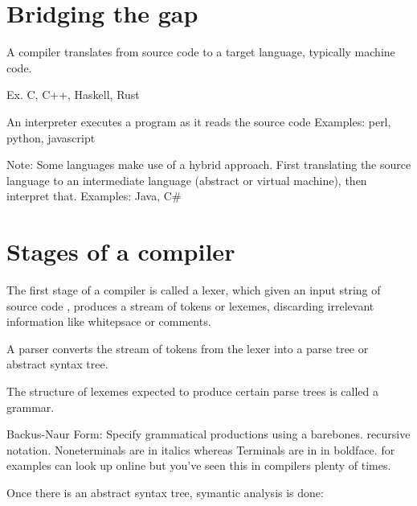 \section{Bridging the gap}

\begin{definition}
  A compiler translates from source code to a target language,
  typically machine code. 
\end{definition}
Ex. C, C++, Haskell, Rust

\begin{definition}
 An interpreter executes a program as it reads the source code 
 Examples: perl, python, javascript
\end{definition}

Note: Some languages make use of a hybrid approach. First translating
the source language to an intermediate language (abstract or virtual machine),
then interpret that. 
Examples: Java, C\#

\section{Stages of a compiler}

\begin{definition}
The first stage of a compiler is called a lexer, which given an input string of source
code , produces a stream of tokens or lexemes, discarding irrelevant information
like whitepsace or comments.
\end{definition}

\begin{definition}
 A parser converts the stream of tokens from the lexer
    into a parse tree or abstract syntax tree.
\end{definition}

\begin{definition}
  The structure of lexemes expected to produce certain parse trees is called a grammar.
\end{definition}

\begin{definition}
  Backus-Naur Form: Specify grammatical productions using a barebones.
  recursive notation. Noneterminals are in italics whereas Terminals are in in boldface.
  for examples can look up online but you've seen this in compilers plenty of times.
\end{definition}

Once there is an abstract syntax tree, symantic analysis is done:

